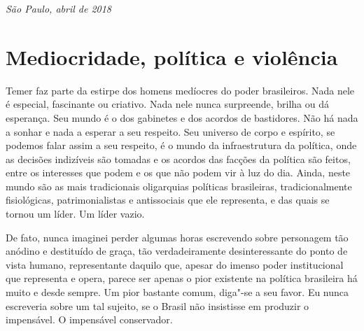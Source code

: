 \medskip

\begin{flushright}
\emph{São Paulo, abril de 2018}
\end{flushright}

\chapter{Mediocridade, política e violência}

Temer faz parte da estirpe dos homens medíocres do poder brasileiros.
Nada nele é especial, fascinante ou criativo. Nada nele nunca
surpreende, brilha ou dá esperança. Seu mundo é o dos gabinetes e dos
acordos de bastidores. Não há nada a sonhar e nada a esperar a seu
respeito. Seu universo de corpo e espírito, se podemos falar assim a seu
respeito, é o mundo da infraestrutura da política, onde as decisões
indizíveis são tomadas e os acordos das facções da política são feitos,
entre os interesses que podem e os que não podem vir à luz do dia.
Ainda, neste mundo são as mais tradicionais oligarquias políticas
brasileiras, tradicionalmente fisiológicas, patrimonialistas e
antissociais que ele representa, e das quais se tornou um líder. Um
líder vazio.

De fato, nunca imaginei perder algumas horas escrevendo sobre personagem
tão anódino e destituído de graça, tão verdadeiramente desinteressante
do ponto de vista humano, representante daquilo que, apesar do imenso
poder institucional que representa e opera, parece ser apenas o pior
existente na política brasileira há muito e desde sempre. Um pior
bastante comum, diga"-se a seu favor. Eu nunca escreveria sobre um tal
sujeito, se o Brasil não insistisse em produzir o impensável. O
impensável conservador.

